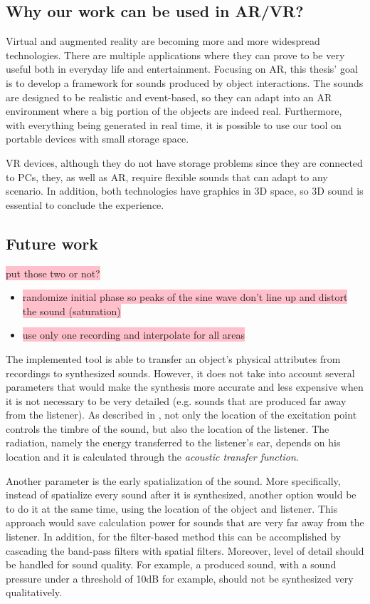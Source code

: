 \subsection{Why our work can be used in AR/VR?}
Virtual and augmented reality are becoming more and more widespread technologies. There are multiple applications where they can prove to be very useful both in everyday life and entertainment. Focusing on \gls{AR}, this thesis' goal is to develop a framework for sounds produced by object interactions. The sounds are designed to be realistic and event-based, so they can adapt into an \gls{AR} environment where a big portion of the objects are indeed real. Furthermore, with everything being generated in real time, it is possible to use our tool on portable devices with small storage space.

\gls{VR} devices, although they do not have storage problems since they are connected to PCs, they, as well as \gls{AR}, require flexible sounds that can adapt to any scenario. In addition, both technologies have graphics in 3D space, so 3D sound is essential to conclude the experience.

\subsection{Future work}
\colorbox{pink}{put those two or not?}
\begin{itemize}
\item \colorbox{pink}{randomize initial phase so peaks of the sine wave don't line up and distort the sound (saturation)}
\item \colorbox{pink}{use only one recording and interpolate for all areas}
\end{itemize}

The implemented tool is able to transfer an object's physical attributes from recordings to synthesized sounds. However, it does not take into account several parameters that would make the synthesis more accurate and less expensive when it is not necessary to be very detailed (e.g. sounds that are produced far away from the listener). As described in \cite{corbett2007timbrefields}, not only the location of the excitation point controls the timbre of the sound, but also the location of the listener. The radiation, namely the energy transferred to the listener's ear, depends on his location and it is calculated through the \textit{acoustic transfer function}. 

Another parameter is the early spatialization of the sound. More specifically, instead of spatialize every sound after it is synthesized, another option would be to do it at the same time, using the location of the object and listener. This approach would save calculation power for sounds that are very far away from the listener. In addition, for the filter-based method this can be accomplished by cascading the band-pass filters with spatial filters. Moreover, level of detail should be handled for sound quality. For example, a produced sound, with a sound pressure under a threshold of 10dB for example, should not be synthesized very qualitatively.   

